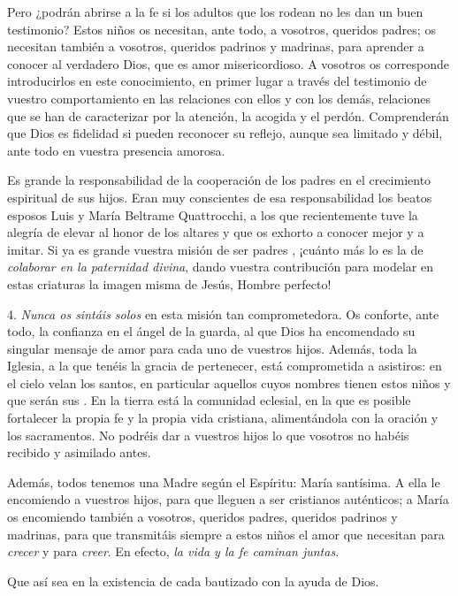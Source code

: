 \begin{body}
					Pero ¿podrán abrirse a la fe si los adultos que los rodean no les dan un buen testimonio? Estos niños os necesitan, ante todo, a vosotros, queridos padres; os necesitan también a vosotros, queridos padrinos y madrinas, para aprender a conocer al verdadero Dios, que es amor misericordioso. A vosotros os corresponde introducirlos en este conocimiento, en primer lugar a través del testimonio de vuestro comportamiento en las relaciones con ellos y con los demás, relaciones que se han de caracterizar por la atención, la acogida y el perdón. Comprenderán que Dios es fidelidad si pueden reconocer su reflejo, aunque sea limitado y débil, ante todo en vuestra presencia amorosa.
					
					Es grande la responsabilidad de la cooperación de los padres en el crecimiento espiritual de sus hijos. Eran muy conscientes de esa responsabilidad los beatos esposos Luis y María Beltrame Quattrocchi, a los que recientemente tuve la alegría de elevar al honor de los altares y que os exhorto a conocer mejor y a imitar. Si ya es grande vuestra misión de ser padres , ¡cuánto más lo es la de \emph{colaborar en la paternidad divina}, dando vuestra contribución para modelar en estas criaturas la imagen misma de Jesús, Hombre perfecto!
					
					4. \emph{Nunca os sintáis solos} en esta misión tan comprometedora. Os conforte, ante todo, la confianza en el ángel de la guarda, al que Dios ha encomendado su singular mensaje de amor para cada uno de vuestros hijos. Además, toda la Iglesia, a la que tenéis la gracia de pertenecer, está comprometida a asistiros: en el cielo velan los santos, en particular aquellos cuyos nombres tienen estos niños y que serán sus . En la tierra está la comunidad eclesial, en la que es posible fortalecer la propia fe y la propia vida cristiana, alimentándola con la oración y los sacramentos. No podréis dar a vuestros hijos lo que vosotros no habéis recibido y asimilado antes.
					
					Además, todos tenemos una Madre según el Espíritu: María santísima. A ella le encomiendo a vuestros hijos, para que lleguen a ser cristianos auténticos; a María os encomiendo también a vosotros, queridos padres, queridos padrinos y madrinas, para que transmitáis siempre a estos niños el amor que necesitan para \emph{crecer} y para \emph{creer}. En efecto, \emph{la vida y la fe caminan juntas}.
					
					Que así sea en la existencia de cada bautizado con la ayuda de Dios.
				\end{body}
			

